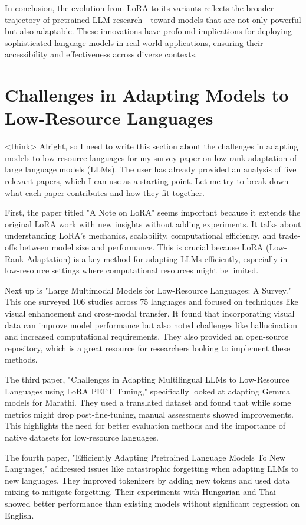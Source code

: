 \documentclass[conference]{IEEEtran}
\begin{document}
In conclusion, the evolution from LoRA to its variants reflects the broader trajectory of pretrained LLM research—toward models that are not only powerful but also adaptable. These innovations have profound implications for deploying sophisticated language models in real-world applications, ensuring their accessibility and effectiveness across diverse contexts.

\section{Challenges in Adapting Models to Low-Resource Languages}
<think>
Alright, so I need to write this section about the challenges in adapting models to low-resource languages for my survey paper on low-rank adaptation of large language models (LLMs). The user has already provided an analysis of five relevant papers, which I can use as a starting point. Let me try to break down what each paper contributes and how they fit together.

First, the paper titled "A Note on LoRA" seems important because it extends the original LoRA work with new insights without adding experiments. It talks about understanding LoRA's mechanics, scalability, computational efficiency, and trade-offs between model size and performance. This is crucial because LoRA (Low-Rank Adaptation) is a key method for adapting LLMs efficiently, especially in low-resource settings where computational resources might be limited.

Next up is "Large Multimodal Models for Low-Resource Languages: A Survey." This one surveyed 106 studies across 75 languages and focused on techniques like visual enhancement and cross-modal transfer. It found that incorporating visual data can improve model performance but also noted challenges like hallucination and increased computational requirements. They also provided an open-source repository, which is a great resource for researchers looking to implement these methods.

The third paper, "Challenges in Adapting Multilingual LLMs to Low-Resource Languages using LoRA PEFT Tuning," specifically looked at adapting Gemma models for Marathi. They used a translated dataset and found that while some metrics might drop post-fine-tuning, manual assessments showed improvements. This highlights the need for better evaluation methods and the importance of native datasets for low-resource languages.

The fourth paper, "Efficiently Adapting Pretrained Language Models To New Languages," addressed issues like catastrophic forgetting when adapting LLMs to new languages. They improved tokenizers by adding new tokens and used data mixing to mitigate forgetting. Their experiments with Hungarian and Thai showed better performance than existing models without significant regression on English.
\end{document}
